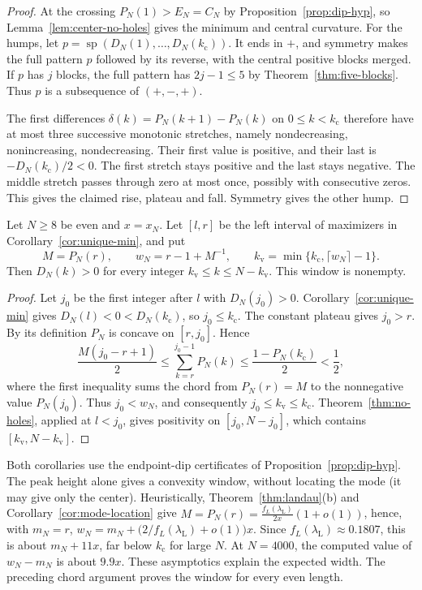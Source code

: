 \begin{proof}
At the crossing $P_N(1)>E_N=C_N$ by Proposition~\ref{prop:dip-hyp}, so
Lemma~\ref{lem:center-no-holes} gives the minimum and central curvature.
For the humps, let $p=\operatorname{sp}(D_N(1),\dots,D_N({k_{\mathrm c}}))$.
It ends in $+$, and symmetry makes the full pattern $p$ followed by its
reverse, with the central positive blocks merged. If $p$ has $j$ blocks,
the full pattern has $2j-1\le5$ by Theorem~\ref{thm:five-blocks}.
Thus $p$ is a subsequence of $(+,-,+)$.

The first differences $\delta(k)=P_N(k+1)-P_N(k)$ on $0\le k<{k_{\mathrm c}}$
therefore have at most three successive monotonic stretches, namely
nondecreasing, nonincreasing, nondecreasing. Their first value is positive,
and their last is $-D_N({k_{\mathrm c}})/2<0$. The first stretch stays positive and the
last stays negative. The middle stretch passes through zero at most once,
possibly with consecutive zeros. This gives the claimed rise, plateau
and fall. Symmetry gives the other hump.
\end{proof}

\begin{corollary}\label{cor:height-window}
Let $N\ge8$ be even and $x=x_N$. Let $[l,r]$ be the left
interval of maximizers in Corollary~\ref{cor:unique-min}, and put
\[
 M=P_N(r),\qquad w_N=r-1+M^{-1},\qquad
 k_{\mathrm v}=\min\{{k_{\mathrm c}},\lceil w_N\rceil-1\}.
\]
Then $D_N(k)>0$ for every integer $k_{\mathrm v}\le k\le N-k_{\mathrm v}$.
This window is nonempty.
\end{corollary}

\begin{proof}
Let $j_0$ be the first integer after $l$ with $D_N(j_0)>0$.
Corollary~\ref{cor:unique-min} gives $D_N(l)<0<D_N({k_{\mathrm c}})$,
so $j_0\le {k_{\mathrm c}}$. The constant plateau gives $j_0>r$.
By its definition $P_N$ is concave on $[r,j_0]$. Hence
\[
 \frac{M(j_0-r+1)}2
 \le\sum_{k=r}^{j_0-1}P_N(k)
 \le\frac{1-P_N({k_{\mathrm c}})}2<\frac12,
\]
where the first inequality sums the chord from $P_N(r)=M$
to the nonnegative value $P_N(j_0)$. Thus $j_0<w_N$, and consequently
$j_0\le k_{\mathrm v}\le {k_{\mathrm c}}$. Theorem~\ref{thm:no-holes}, applied at $l<j_0$,
gives positivity on $[j_0,N-j_0]$, which contains $[k_{\mathrm v},N-k_{\mathrm v}]$.
\end{proof}

Both corollaries use the endpoint-dip certificates of
Proposition~\ref{prop:dip-hyp}. The peak height alone gives a convexity
window, without locating the mode (it may give only the center).
Heuristically, Theorem~\ref{thm:landau}(b) and
Corollary~\ref{cor:mode-location} give
$M=P_N(r)=\frac{f_L(\lambda_{\mathrm L})}{2x}(1+o(1))$, hence, with $m_N=r$,
$w_N=m_N+\bigl(2/f_L(\lambda_{\mathrm L})+o(1)\bigr)x$. Since
$f_L(\lambda_{\mathrm L})\approx0.1807$, this is about $m_N+11x$, far below ${k_{\mathrm c}}$ for large $N$.
At $N=4000$, the computed value of $w_N-m_N$ is about $9.9x$.
These asymptotics explain the expected width. The preceding chord
argument proves the window for every even length.
